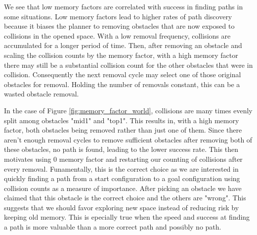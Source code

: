 

We see that low memory factors are correlated with success in finding paths in some situations. Low memory factors lead to higher rates of path discovery because it biases the planner to removing obstacles that are now exposed to collisions in the opened space. With a low removal frequency, collisions are accumulated for a longer period of time. Then, after removing an obstacle and scaling the collision counts by the memory factor, with a high memory factor there may still be a substantial collision count for the other obstacles that were in collision. Consequently the next removal cycle may select one of those original obstacles for removal. Holding the number of removals constant, this can be a wasted obstacle removal. 

In the case of Figure \ref{fig:memory_factor_world}, collisions are many times evenly split among obstacles "mid1" and "top1". This results in, with a high memory factor, both obstacles being removed rather than just one of them. Since there aren't enough removal cycles to remove sufficient obstacles after removing both of these obstacles, no path is found, leading to the lower success rate. This then motivates using 0 memory factor and restarting our counting of collisions after every removal. Funamentally, this is the correct choice as we are interested in quickly finding a path from a start configuration to a goal configuration using collision counts as a measure of importance. After picking an obstacle we have claimed that this obstacle is the correct choice and the others are "wrong". This suggests that we should favor exploring new space instead of reducing risk by keeping old memory. This is epecially true when the speed and success at finding a path is more valuable than a more correct path and possibly no path.


